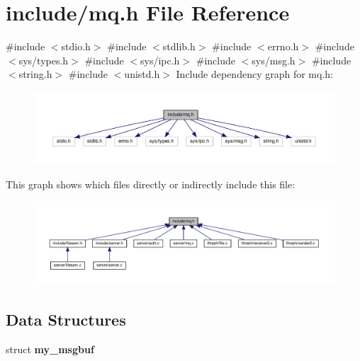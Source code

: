 \section{include/mq.h File Reference}
\label{mq_8h}
{\ttfamily \#include $<$stdio.\+h$>$}\newline
{\ttfamily \#include $<$stdlib.\+h$>$}\newline
{\ttfamily \#include $<$errno.\+h$>$}\newline
{\ttfamily \#include $<$sys/types.\+h$>$}\newline
{\ttfamily \#include $<$sys/ipc.\+h$>$}\newline
{\ttfamily \#include $<$sys/msg.\+h$>$}\newline
{\ttfamily \#include $<$string.\+h$>$}\newline
{\ttfamily \#include $<$unistd.\+h$>$}\newline
Include dependency graph for mq.\+h\+:\nopagebreak
\begin{figure}[H]
\begin{center}
\leavevmode
\includegraphics[width=350pt]{mq_8h__incl}
\end{center}
\end{figure}
This graph shows which files directly or indirectly include this file\+:
\nopagebreak
\begin{figure}[H]
\begin{center}
\leavevmode
\includegraphics[width=350pt]{mq_8h__dep__incl}
\end{center}
\end{figure}
\subsection*{Data Structures}
\begin{DoxyCompactItemize}
\item 
struct \textbf{ my\+\_\+msgbuf}
\end{DoxyCompactItemize}
